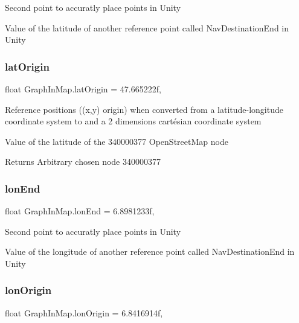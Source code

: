 Second point to accuratly place points in Unity 

Value of the latitude of another reference point called Nav\+Destination\+End in Unity\mbox{\label{classGraphInMap_aa8378e8c900bf9192e921b2050f4d2a4}} 
\subsubsection{\texorpdfstring{lat\+Origin}{latOrigin}}
{\footnotesize\ttfamily float Graph\+In\+Map.\+lat\+Origin = 47.\+665222f\hspace{0.3cm}{\ttfamily [static]}, {\ttfamily [private]}}



Reference positions ((x,y) origin) when converted from a latitude-\/longitude coordinate system to and a 2 dimensions cartésian coordinate system 

Value of the latitude of the 340000377 Open\+Street\+Map node

\begin{DoxyReturn}{Returns}
Arbitrary chosen node 340000377
\end{DoxyReturn}
\mbox{\label{classGraphInMap_a4e63761178f713380882e24c9314d882}} 
\subsubsection{\texorpdfstring{lon\+End}{lonEnd}}
{\footnotesize\ttfamily float Graph\+In\+Map.\+lon\+End = 6.\+8981233f\hspace{0.3cm}{\ttfamily [static]}, {\ttfamily [private]}}



Second point to accuratly place points in Unity 

Value of the longitude of another reference point called Nav\+Destination\+End in Unity\mbox{\label{classGraphInMap_ad976da0443161f13f73a84661e148cd5}} 
\subsubsection{\texorpdfstring{lon\+Origin}{lonOrigin}}
{\footnotesize\ttfamily float Graph\+In\+Map.\+lon\+Origin = 6.\+8416914f\hspace{0.3cm}{\ttfamily [static]}, {\ttfamily [private]}}



